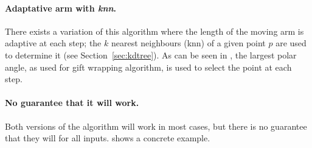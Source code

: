 %

\paragraph{Adaptative arm with \emph{knn}.} 
There exists a variation of this algorithm where the length of the moving arm is adaptive at each step; the $k$ nearest neighbours (knn) of a given point $p$ are used to determine it (see Section~\ref{sec:kdtree}).
As can be seen in , the largest polar angle, as used for gift wrapping algorithm, is used to select the point at each step.

%

\paragraph{No guarantee that it will work.} 
Both versions of the algorithm will work in most cases, but there is no guarantee that they will for all inputs.
 shows a concrete example.
